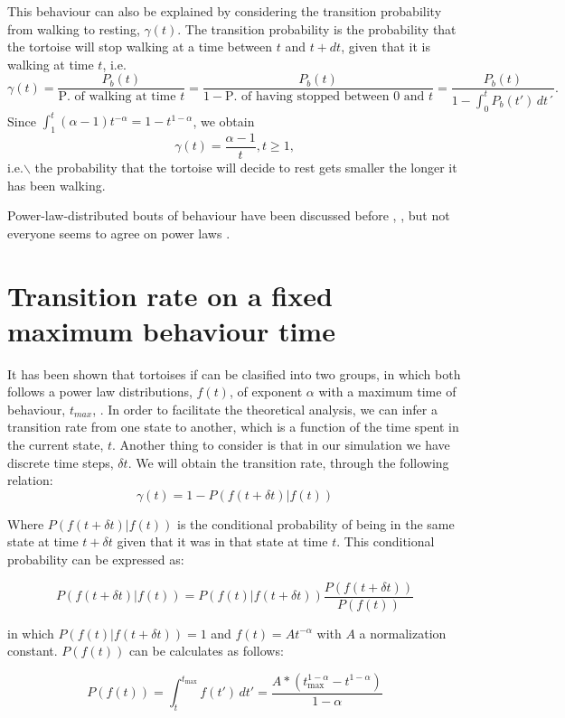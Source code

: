 \documentclass[a4paper]{article}
\begin{document}
This behaviour can also be explained by considering the transition probability from walking to resting, \(\gamma(t)\).  The transition probability is the probability that the tortoise will stop walking at a time between \(t\) and \(t+dt\), given that it is walking at time \(t\), i.e.
$$ \gamma(t) = \frac{P_b(t)}{\text{P. of walking at time $t$}} = \frac{P_b(t)}{1 - \text{P. of having stopped between $0$ and $t$}} = \frac{P_b(t)}{1-\int_0^t\!\!P_b(t')\,dt´} . $$
Since \(\int_1^t (\alpha-1) t^{-\alpha} = 1 - t^{1-\alpha}\), we obtain
$$ \gamma(t) = \frac{\alpha-1}{t},  t\ge1, $$
i.e.$\backslash$ the probability that the tortoise will decide to rest gets smaller the longer it has been walking.

Power-law-distributed bouts of behaviour have been discussed before  \cite{falligant2024}, \cite{gomez2026}, but not everyone seems to agree on power laws \cite{breed2015}.

\section*{Transition rate on a fixed maximum behaviour time}
It has been shown that tortoises if can be clasified into two groups, in which both follows a power law distributions, $f(t)$, of exponent $\alpha$ with a maximum time of behaviour, $t_{max}$, 
\cite{callenbach2025}. In order to facilitate the theoretical analysis, we can infer a transition rate from one state to another, which is a function of the time 
spent in the current state, $t$. Another thing to consider is that in our simulation we have discrete time steps, $\delta t$. We will obtain the transition rate,
through the following relation:
\begin{equation}
    \gamma (t) = 1 - P(f(t+\delta t)|f(t))
\end{equation}

Where $P(f(t+\delta t)|f(t))$ is the conditional probability of being in the same state at time $t+\delta t$ given that it was in that state at time $t$. 
This conditional probability can be expressed as:

\begin{equation}
    P(f(t+\delta t)|f(t)) = P(f(t)|f(t+\delta t))\frac{P(f(t+\delta t))}{P(f(t))}
\end{equation}

in which $P(f(t)|f(t+\delta t))=1$ and $f(t)=A t^{-\alpha}$ with $A$ a normalization constant. $P(f(t))$ can be calculates as follows:

\begin{equation}
    P(f(t))=\int_{t}^{t_{\text{max}}}f(t')\,dt'=\frac{A*\left(t_{\text{max}}^{1-\alpha}-t^{1-\alpha}\right)}{1-\alpha}
\end{equation}
\end{document}
